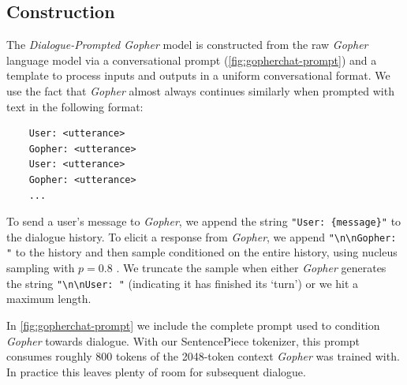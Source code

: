 \documentclass[11pt, a4paper, logo, internal, copyright, nonumbering]{deepmind}
\newcommand{\gopher}{\textit{Gopher}\xspace}
\newcommand{\gopherchat}{\textit{Dialogue-Prompted Gopher}\xspace}
\begin{document}
\subsection{Construction}
\label{appendix:gopherchat-construction}

The \gopherchat model is constructed from the raw \gopher language model via a conversational prompt (\autoref{fig:gopherchat-prompt}) and a template to process inputs and outputs in a uniform conversational format. We use the fact that \gopher almost always continues similarly when prompted with text in the following format:
\begin{verbatim}
    User: <utterance>
    Gopher: <utterance>
    User: <utterance>
    Gopher: <utterance>
    ...
\end{verbatim}
To send a user's message to \gopher, we append the string \texttt{"User: \{message\}"} to the dialogue history. To elicit a response from \gopher, we append \texttt{"\textbackslash n\textbackslash nGopher: "} to the history and then sample conditioned on the entire history, using nucleus sampling with $p = 0.8$ \citep{holtzman2019curious}. We truncate the sample when either \gopher generates the string \texttt{"\textbackslash n\textbackslash nUser: "} (indicating it has finished its `turn') or we hit a maximum length.

In \autoref{fig:gopherchat-prompt} we include the complete prompt used to condition \gopher towards dialogue. With our SentencePiece tokenizer, this prompt consumes roughly 800 tokens of the 2048-token context \gopher was trained with. In practice this leaves plenty of room for subsequent dialogue.
\end{document}
